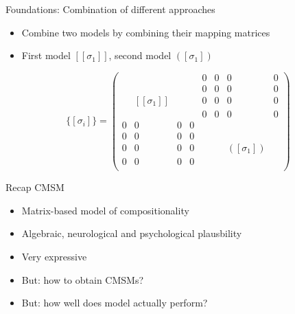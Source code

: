 \documentclass[12pt,a4paper]{beamer}
\begin{document}
\begin{frame}{Foundations: Combination of different approaches}
\begin{itemize}
\item Combine two models by combining their mapping matrices
\item First model $[[\sigma_{1}]]$, second model $([\sigma_{1}])$
\end{itemize}

$$  \{[\sigma_{i}]\} =
\left( \begin{array}{cccc|cccc}
 &  &  &  & 0 & 0 & 0 & 0   \\
 &  &  &  & 0 & 0 & 0 & 0   \\
 & [[\sigma_{1}]]  &  &  & 0 & 0 & 0 & 0   \\
 &  &  &  & 0 & 0 & 0 & 0   \\ \hline
0 & 0 & 0 & 0 &  &  &  &    \\
0 & 0 & 0 & 0 &  &  &  &    \\
0 & 0 & 0 & 0 &  &  & ([\sigma_{1}])  &    \\
0 & 0 & 0 & 0 &  &  &  &    \\
\end{array} \right) $$


\end{frame}


\begin{frame}{Recap CMSM}
\begin{itemize}
\item Matrix-based model of compositionality
\item Algebraic, neurological and psychological plausbility
\item Very expressive
\item But: how to obtain CMSMs?
\item But: how well does model actually perform?
\end{itemize}

\end{frame}
\end{document}
